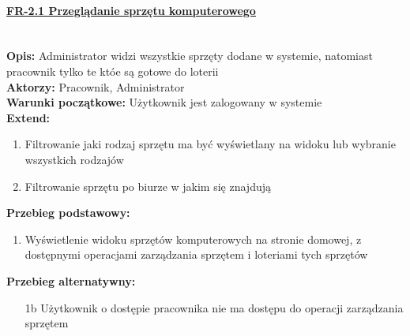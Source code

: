 \paragraph{\underline{FR-2.1 Przeglądanie sprzętu komputerowego}}\mbox{}\\[1mm]
	\noindent\textbf{Opis:} Administrator widzi wszystkie sprzęty dodane w systemie, natomiast pracownik tylko te któe są gotowe do loterii\\
	\noindent\textbf{Aktorzy:} Pracownik, Administrator\\
	\textbf{Warunki początkowe:} Użytkownik jest zalogowany w systemie\\
	\textbf{Extend:} 
	\begin{enumerate}[noparskip]
		\item Filtrowanie jaki rodzaj sprzętu ma być wyświetlany na widoku lub wybranie wszystkich rodzajów
		\item Filtrowanie sprzętu po biurze w jakim się znajdują
	\end{enumerate}
	\textbf{Przebieg podstawowy:}
	\begin{enumerate}[noparskip]
		\item Wyświetlenie widoku sprzętów komputerowych na stronie domowej, z dostępnymi operacjami zarządzania sprzętem i loteriami tych sprzętów
	\end{enumerate} 
	\textbf{Przebieg alternatywny:}
	\begin{enumerate}[noparskip]
		\item[1b] Użytkownik o dostępie pracownika nie ma dostępu do operacji zarządzania sprzętem
	\end{enumerate} \mbox{}\\[-11mm]

